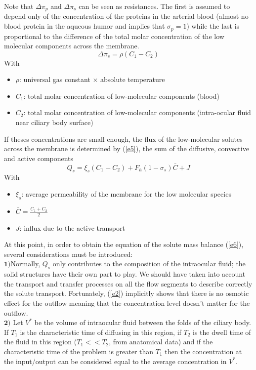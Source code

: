 \documentclass[english,12pt]{article}
\begin{document}
Note that $\Delta \pi_p $ and $\Delta \pi_s $ can be seen as resistances. The first is assumed to depend only of the concentration of the proteins in the arterial blood (almost no blood protein in the aqueous humor and implies that $\sigma_p=1$) while the last is proportional to the difference of the total molar concentration of the low molecular components across the membrane.
\begin{equation}
\Delta\pi_{s}= \rho(C_1-C_{2})
\label{e4}
\end{equation}
With
\begin{itemize}
\item $\rho$: universal gas constant $\times$  absolute temperature
\item $C_1$: total molar concentration of low-molecular components (blood)
\item $C_2$: total molar concentration of low-molecular components (intra-ocular fluid near ciliary body surface)
\end{itemize}
If theses concentrations are small enough, the flux of the low-molecular solutes across the membrane is determined by (\ref{e5}), the sum of the diffusive, convective and active components
\begin{equation}
Q_s=\xi_s(C_1-C_{2})+F_h (1-\sigma_s) \bar{C}+J
\label{e5}
\end{equation}
With
\begin{itemize}
\item $\xi_s$: average permeability of the membrane for the low molecular species
\item $\bar{C}=\frac{C_1+C_2}{2}$
\item $J$: influx due to the active transport
\end{itemize}
At this point, in order to obtain the equation of the solute mass balance (\ref{e6}), several considerations must be introduced:\\
$\textbf{1)}$Normally, $Q_s$ only contributes to the composition of the intraocular fluid; the solid structures have their own part to play. We should have taken into account the transport and transfer processes on all the flow segments to describe correctly the solute transport. Fortunately, (\ref{e2}) implicitly shows that there is no osmotic effect for the outflow meaning that the concentration level doesn't matter for the outflow.\\
$\textbf{2)}$ Let $V^{\ast}$ be the volume of intraocular fluid between the folds of the ciliary body. If $T_1$ is the characteristic time of diffusing in this region, if $T_2$ is the dwell time of the fluid in this region ($T_1<<T_2$, from anatomical data) and if the characteristic time of the problem is greater than $T_1$ then the concentration at the input/output can be considered equal to the average concentration in $V^{\ast}$.\\
\end{document}
